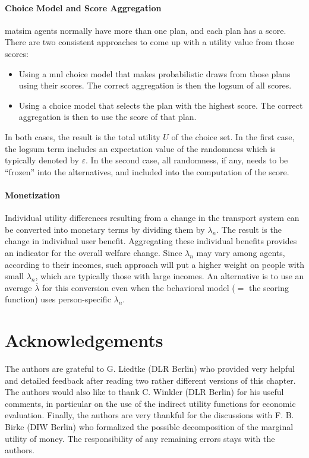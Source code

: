 \paragraph*{Choice Model and Score Aggregation}

\gls{matsim} agents normally have more than one plan, and each plan has a score.  There are two consistent approaches to come up with a utility value from those scores:
\begin{itemize}\styleItemize

\item Using a \gls{mnl} choice model that makes probabilistic draws from those plans using their scores. The correct aggregation is then the logsum of all scores.

\item Using a choice model that selects the plan with the highest score. The correct aggregation is then to use the score of that plan.

\end{itemize}
In both cases, the result is the total utility $U$ of the choice set.  In the first case, the logsum term includes an expectation value of the randomness which is typically denoted by $\varepsilon$.  In the second case, all randomness, if any, needs to be ``frozen'' into the alternatives, and included into the computation of the score.

\paragraph*{Monetization}

Individual utility differences resulting from a change in the transport system can be converted into monetary terms by dividing them by $\lambda_n$. The result is the change in individual user benefit. Aggregating these individual benefits provides an indicator for the overall welfare change.
%
Since $\lambda_n$ may vary among agents, \eg according to their incomes, such approach will put a higher weight on people with small $\lambda_n$, which are typically those with large incomes.  An alternative is to use an average $\overline\lambda$ for this conversion even when the behavioral model ($=$ the scoring function) uses person-specific $\lambda_n$.

\section*{Acknowledgements}
The authors are grateful to G. Liedtke (DLR Berlin) who provided very helpful and detailed feedback after reading two rather different versions of this chapter.
%
The authors would also like to thank C. Winkler (DLR Berlin) for his useful comments, in particular on the use of the indirect utility functions for economic evaluation.
%
Finally, the authors are very thankful for the discussions with F. B. Birke (DIW Berlin) who formalized the possible decomposition of the marginal utility of money.
%
The responsibility of any remaining errors stays with the authors.


